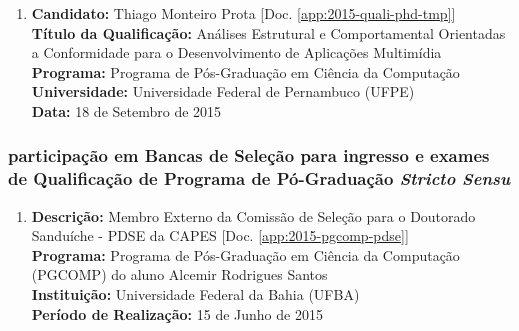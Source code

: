 \documentclass[a4paper,oneside,12pt]{article}
\begin{document}
\begin{enumerate}
\renewcommand{\labelenumi}{{\large\bfseries\arabic{enumi}.}}
\vspace{0.3cm}

\item       \textbf{Candidato:} Thiago Monteiro Prota [Doc. \ref{app:2015-quali-phd-tmp}] \\
            \textbf{Título da Qualificação:} Análises Estrutural e Comportamental Orientadas a Conformidade para o Desenvolvimento de Aplicações Multimídia\\
            \textbf{Programa:} Programa de Pós-Graduação em Ciência da Computação\\
            \textbf{Universidade:} Universidade Federal de Pernambuco (UFPE)\\
            \textbf{Data:} 18 de Setembro de 2015

\end{enumerate}




\subsubsection{participação em Bancas de Seleção para ingresso e exames de Qualificaç\~ao de Programa de Pó-Graduação \textit{Stricto Sensu}}

\begin{enumerate}
\renewcommand{\labelenumi}{{\large\bfseries\arabic{enumi}.}}
\vspace{0.3cm}

\item       \textbf{Descrição:} Membro Externo da Comissão de Seleção para o Doutorado Sanduíche - PDSE da CAPES [Doc. \ref{app:2015-pgcomp-pdse}] \\
            \textbf{Programa:} Programa de Pós-Graduação em Ciência da Computação (PGCOMP) do aluno Alcemir Rodrigues Santos\\
            \textbf{Instituição:} Universidade Federal da Bahia (UFBA) \\
            \textbf{Período de Realização:} 15 de Junho de 2015

\end{enumerate}

\end{document}
